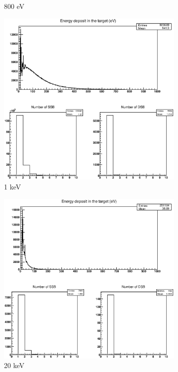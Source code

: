 \begin{figure}
\begin{subfigure}{.5\textwidth}
  \caption{800 eV}
  \label{fig:subei5}
\end{subfigure}%
\begin{subfigure}{.5\textwidth}
  \centering
  \includegraphics[width=.78\linewidth]{./Figures/1zbbe800ev.eps}
  \caption{1 keV}
  \label{fig:subei6}
\end{subfigure}
\begin{subfigure}{.5\textwidth}
  \centering
  \includegraphics[width=.78\linewidth]{./Figures/1zbbe20kev.eps}
  \caption{20 keV}
  \label{fig:subei7}
\end{subfigure}%
\begin{subfigure}{.5\textwidth}
  \centering

\end{subfigure}
\end{figure}
